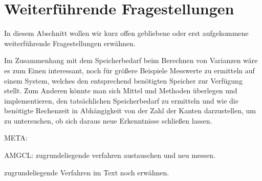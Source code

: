 \documentclass[a4paper]{article}
\theoremstyle{nonumberplain}
\newenvironment{meta}
{\begin{center} \Large \color{red} META: \hspace{2ex} \large \color{blue}}
	{\end{center}}
\begin{document}
\begin{center}
\end{center}


\section{Weiterführende Fragestellungen}

In diesem Abschnitt wollen wir kurz offen gebliebene oder erst aufgekommene weiterführende Fragestellungen erwähnen.


Im Zusammenhang mit dem Speicherbedarf beim Berechnen von Varianzen wäre es zum Einen interessant, noch für größere Beispiele Messwerte zu ermitteln auf einem System, welches den entsprechend benötigten Speicher zur Verfügung stellt. Zum Anderen könnte man sich Mittel und Methoden überlegen und implementieren, den tatsächlichen Speicherbedarf zu ermitteln und wie die benötigte Rechenzeit in Abhängigkeit von der Zahl der Kanten darzustellen, um zu untersuchen, ob sich daraus neue Erkenntnisse schließen lassen.


\begin{meta}
	
	\item AMGCL: zugrundeliegende verfahren austauschen und neu messen.
	\item zugrundeliegende Verfahren im Text noch erwähnen.
	
\end{meta}
\end{document}
